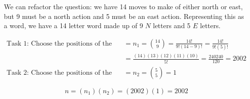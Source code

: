     \begin{mdframed}
        We can refactor the question: we have 14 moves to make of either north or east, but 9 must be a north action and 5 must be an east action. Representing this as a word, we have a 14 letter word made up of 9 $N$ letters and 5 $E$ letters. 

        \begin{align*}
            \text{Task 1: Choose the positions of the N's} & = n_1 = {14 \choose 9} = \frac{14!}{9!(14-9)!} = \frac{14!}{9!(5)!}    \\ 
            & = \frac{(14)(13)(12)(11)(10)}{5!} = \frac{240240}{120} = 2002 \\
            \text{Task 2: Choose the positions of the E's} & = n_2 = {5 \choose 5} = 1
        \end{align*}

        \begin{equation*}
            n = (n_1)(n_2) = (2002)(1) = \boxed{2002}
        \end{equation*}
        
    \end{mdframed}

